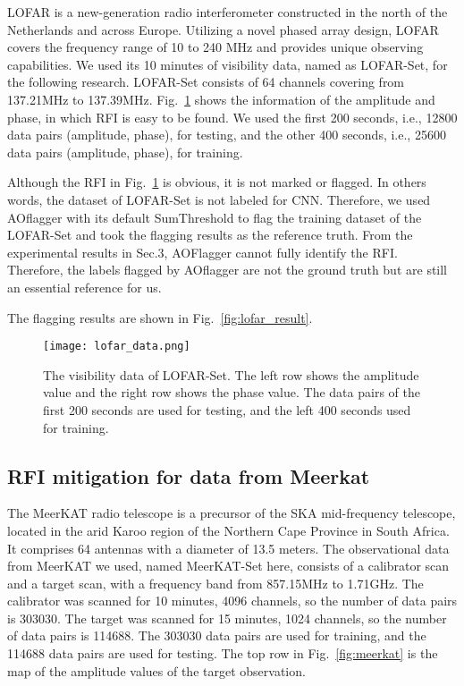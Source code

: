 \documentclass[usenatbib]{mnras}
\begin{document}
LOFAR is a new-generation radio interferometer constructed in the north of the Netherlands and across Europe. Utilizing a novel phased array design, LOFAR covers the frequency range of  10 to 240 MHz and provides unique observing capabilities. We used its 10 minutes of visibility data, named as LOFAR-Set, for the following research. LOFAR-Set consists of 64 channels covering from 137.21MHz to 137.39MHz. Fig.~\ref{fig:lofar} shows the information of the amplitude and phase, in which RFI is easy to be found. We used the first 200 seconds, i.e., 12800 data pairs (amplitude, phase), for testing, and the other 400 seconds, i.e., 25600 data pairs (amplitude, phase), for training.

Although the RFI in Fig.~\ref{fig:lofar} is obvious, it is not marked or flagged. In others words, the dataset of LOFAR-Set is not labeled for CNN. Therefore, we used AOflagger with its default SumThreshold to flag the training dataset of the LOFAR-Set and took the flagging results as the reference truth. From the experimental results in Sec.3, AOFlagger cannot fully identify the RFI. Therefore, the labels flagged by AOflagger are not the ground truth but are still an essential reference for us.

The flagging results are shown in Fig.~\ref{fig:lofar_result}.


\begin{figure}
\begin{center}
	\texttt{[image: lofar\_data.png]}
\end{center}
    \caption{The visibility data of LOFAR-Set. The left row shows the amplitude value and the right row shows the phase value. The data pairs of the first 200 seconds are used for testing, and the left 400 seconds used for training.}
    \label{fig:lofar}
\end{figure}

\subsection{RFI mitigation for data from Meerkat}

The MeerKAT radio telescope is a precursor of the SKA mid-frequency telescope, located in the arid Karoo region of the Northern Cape Province in South Africa. It comprises 64 antennas with a diameter of 13.5 meters. The observational data from MeerKAT we used, named MeerKAT-Set here, consists of a calibrator scan and a target scan, with a frequency band from 857.15MHz to 1.71GHz. The calibrator was scanned for 10 minutes, 4096 channels, so the number of data pairs is 303030. The target was scanned for 15 minutes, 1024 channels, so the number of data pairs is 114688. The 303030 data pairs are used for training, and the 114688 data pairs are used for testing. The top row in Fig.~\ref{fig:meerkat} is the map of the amplitude values of the target observation.
\end{document}
